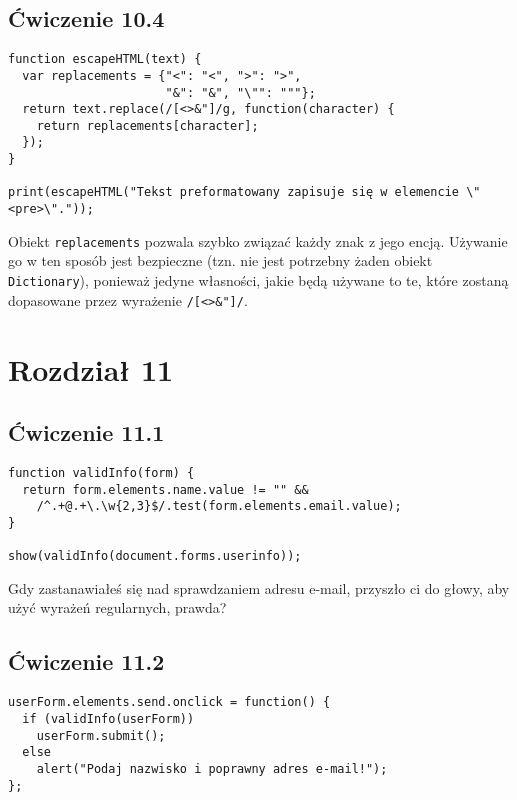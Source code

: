   
\subsection*{Ćwiczenie 10.4}
\label{sol:10.4}
    
\begin{verbatim} 
function escapeHTML(text) {
  var replacements = {"<": "<", ">": ">",
                      "&": "&", "\"": """};
  return text.replace(/[<>&"]/g, function(character) {
    return replacements[character];
  });
}

print(escapeHTML("Tekst preformatowany zapisuje się w elemencie \"<pre>\"."));
\end{verbatim}
    
Obiekt \texttt{replacements} pozwala szybko związać każdy znak z jego encją. Używanie go w ten sposób jest bezpieczne (tzn. nie jest potrzebny żaden obiekt \texttt{Dictionary}), ponieważ jedyne własności, jakie będą używane to te, które zostaną dopasowane przez wyrażenie \texttt{/[<>\&"]/}.

\section*{Rozdział 11}
\label{sol:11}
  
\subsection*{Ćwiczenie 11.1}
\label{sol:11.1}
    
\begin{verbatim} 
function validInfo(form) {
  return form.elements.name.value != "" &&
    /^.+@.+\.\w{2,3}$/.test(form.elements.email.value);
}

show(validInfo(document.forms.userinfo));
\end{verbatim}
    
Gdy zastanawiałeś się nad sprawdzaniem adresu e-mail, przyszło ci do głowy, aby użyć wyrażeń regularnych, prawda?

  
\subsection*{Ćwiczenie 11.2}
\label{sol:11.2}
    
\begin{verbatim} 
userForm.elements.send.onclick = function() {
  if (validInfo(userForm))
    userForm.submit();
  else
    alert("Podaj nazwisko i poprawny adres e-mail!");
};
\end{verbatim}

